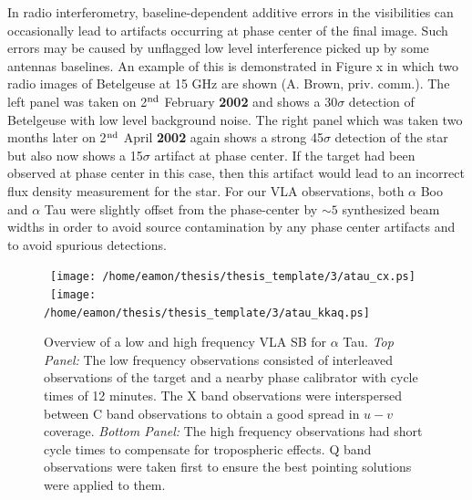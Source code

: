 In radio interferometry, baseline-dependent additive errors in the visibilities can occasionally lead to artifacts occurring at phase center of the final image. Such errors may be caused by unflagged low level interference picked up by some antennas baselines. An example of this is demonstrated in Figure x in which two radio images of Betelgeuse at 15 GHz are shown (A. Brown, priv. comm.). The left panel was taken on 2$^{\rm{nd}}$ February \textbf{2002} and shows a 30$\sigma$ detection of Betelgeuse with low level background noise. The right panel which was taken two months later on 2$^{\rm{nd}}$ April \textbf{2002} again shows a strong 45$\sigma$ detection of the star but also now shows a 15$\sigma$ artifact at phase center. If the target had been observed at phase center in this case, then this artifact would lead to an incorrect flux density measurement for the star. For our VLA observations, both $\alpha$ Boo and $\alpha$ Tau were slightly offset from the phase-center by $\sim 5$ synthesized beam widths in order to avoid source contamination by any phase center artifacts and to avoid spurious detections. 

\begin{figure}[hbt!]
\centering 
\mbox{
          \texttt{[image: /home/eamon/thesis/thesis\_template/3/atau\_cx.ps]}}
\mbox{
          \texttt{[image: /home/eamon/thesis/thesis\_template/3/atau\_kkaq.ps]}
          }
\caption[Overview of a low and high frequency VLA observation.]{Overview of a low and high frequency VLA SB for $\alpha$ Tau. \textit{Top Panel:} The low frequency observations consisted of interleaved
observations of the target and a nearby phase calibrator with cycle times of 12 minutes. The X band observations were interspersed between C band observations to obtain a good spread in $u-v$ coverage. \textit{Bottom Panel:} The high frequency observations had short cycle times to compensate for tropospheric effects. Q band observations were taken first to ensure the best pointing solutions were applied to them. }
\label{}
\end{figure}

